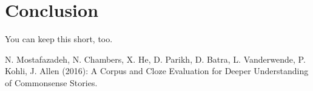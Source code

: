 \documentclass{article}
\begin{document}
\section{Conclusion}
You can keep this short, too.

\pagebreak

\begin{thebibliography}{}
 
 N. Mostafazadeh, N. Chambers, X. He, D. Parikh, D. Batra, L. Vanderwende, P. Kohli, J. Allen (2016): A Corpus and Cloze Evaluation for Deeper Understanding of Commonsense Stories.


\end{thebibliography}
\end{document}
